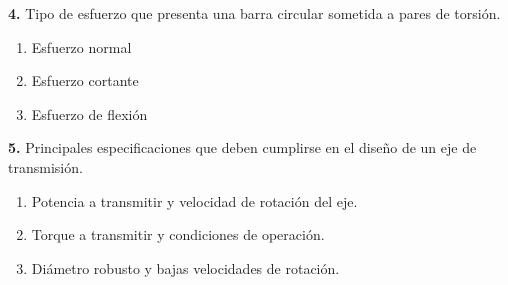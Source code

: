 \documentclass[10pt,letterpaper,twocolumn]{article}
\newcommand{\puntos}[1]{ {\small\sffamily [#1 \%]} }
\begin{document}
\textbf{4.} Tipo de esfuerzo que presenta una barra circular sometida a pares de torsión. \puntos{5}

\begin{enumerate}[label=\alph*),itemsep=0pt]
\item Esfuerzo normal
\item Esfuerzo cortante
\item Esfuerzo de flexión
\end{enumerate}

\textbf{5.} Principales especificaciones que deben cumplirse en el diseño de un eje de transmisión. \puntos{5}

\begin{enumerate}[label=\alph*),itemsep=0pt]
\item Potencia a transmitir y velocidad de rotación del eje.
\item Torque a transmitir y condiciones de operación.
\item Diámetro robusto y bajas velocidades de rotación.
\end{enumerate}
\end{document}
